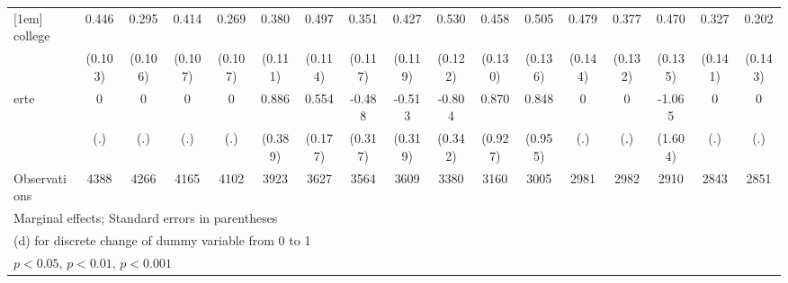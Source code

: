 {\begin{tabular}{l*{16}{c}}
[1em]
college             &       0.446\sym{***}&       0.295\sym{**} &       0.414\sym{***}&       0.269\sym{*}  &       0.380\sym{***}&       0.497\sym{***}&       0.351\sym{**} &       0.427\sym{***}&       0.530\sym{***}&       0.458\sym{***}&       0.505\sym{***}&       0.479\sym{***}&       0.377\sym{**} &       0.470\sym{***}&       0.327\sym{*}  &       0.202         \\
                    &     (0.103)         &     (0.106)         &     (0.107)         &     (0.107)         &     (0.111)         &     (0.114)         &     (0.117)         &     (0.119)         &     (0.122)         &     (0.130)         &     (0.136)         &     (0.144)         &     (0.132)         &     (0.135)         &     (0.141)         &     (0.143)         \\
[1em]
erte                &           0         &           0         &           0         &           0         &       0.886\sym{*}  &       0.554\sym{**} &      -0.488         &      -0.513         &      -0.804\sym{*}  &       0.870         &       0.848         &           0         &           0         &      -1.065         &           0         &           0         \\
                    &         (.)         &         (.)         &         (.)         &         (.)         &     (0.389)         &     (0.177)         &     (0.317)         &     (0.319)         &     (0.342)         &     (0.927)         &     (0.955)         &         (.)         &         (.)         &     (1.604)         &         (.)         &         (.)         \\
\hline
Observations        &        4388         &        4266         &        4165         &        4102         &        3923         &        3627         &        3564         &        3609         &        3380         &        3160         &        3005         &        2981         &        2982         &        2910         &        2843         &        2851         \\
\hline\hline
\multicolumn{17}{l}{\footnotesize Marginal effects; Standard errors in parentheses}\\
\multicolumn{17}{l}{\footnotesize  (d) for discrete change of dummy variable from 0 to 1}\\
\multicolumn{17}{l}{\footnotesize \sym{*} \(p<0.05\), \sym{**} \(p<0.01\), \sym{***} \(p<0.001\)}\\
\end{tabular}
}
